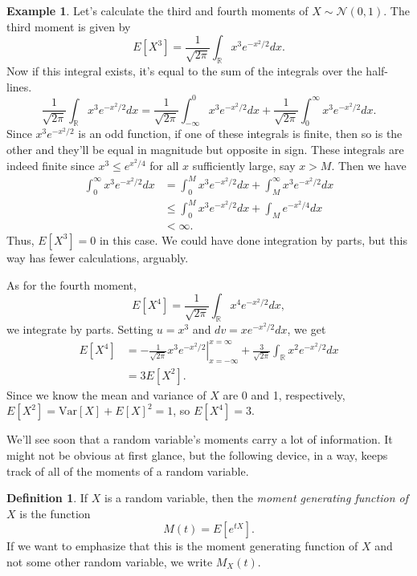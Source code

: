 \documentclass[12pt]{article}
\theoremstyle{plain}
\theoremstyle{definition}
\newtheorem{definition}[theorem]{Definition}
\newtheorem{example}[theorem]{Example}
\theoremstyle{remark}
\newcommand{\Var}{\ensuremath{\textrm{Var}}}
\newcommand{\R}{\mathbb{R}}
\begin{document}
\begin{example}
    Let's calculate the third and fourth moments of $X\sim \mathcal{N}(0, 1)$.
    The third moment is given by
    \[
        E[X^3] = \frac{1}{\sqrt{2\pi}}\int_\R x^3 e^{-x^2/2}dx.
    \]
    Now if this integral exists, it's equal to the sum of the integrals over the half-lines.
    \[
        \frac{1}{\sqrt{2\pi}}\int_\R x^3e^{-x^2/2}dx = \frac{1}{\sqrt{2\pi}}\int_{-\infty}^0 x^3e^{-x^2/2}dx + \frac{1}{\sqrt{2\pi}}\int_0^\infty x^3e^{-x^2/2}dx.
    \]
    Since $x^3e^{-x^2/2}$ is an odd function, if one of these integrals is finite, then so is the other and they'll be equal in magnitude but opposite in sign.
    These integrals are indeed finite since $x^3 \leq e^{x^2/4}$ for all $x$ sufficiently large, say $x>M$.
    Then we have
    \begin{align*}
        \int_0^\infty x^3e^{-x^2/2}dx &= \int_0^M x^3e^{-x^2/2}dx + \int_M^\infty x^3e^{-x^2/2}dx\\
        &\leq \int_0^Mx^3e^{-x^2/2}dx + \int_Me^{-x^2/4}dx\\
        &<\infty.
    \end{align*}
    Thus, $E[X^3] = 0$ in this case.
    We could have done integration by parts, but this way has fewer calculations, arguably.

    As for the fourth moment,
    \[
        E[X^4] = \frac{1}{\sqrt{2\pi}}\int_\R x^4e^{-x^2/2}dx,
    \]
    we integrate by parts.
    Setting $u = x^3$ and $dv = xe^{-x^2/2}dx$, we get
    \begin{align*}
        E[X^4] &= \left.-\frac{1}{\sqrt{2\pi}}x^3e^{-x^2/2}\right|_{x=-\infty}^{x = \infty} + \frac{3}{\sqrt{2\pi}}\int_\R x^2e^{-x^2/2}dx\\
        &= 3E[X^2].
    \end{align*}
    Since we know the mean and variance of $X$ are 0 and 1, respectively, $E[X^2] = \Var[X] + E[X]^2 = 1$, so $E[X^4] = 3$.
\end{example}

We'll see soon that a random variable's moments carry a lot of information.
It might not be obvious at first glance, but the following device, in a way, keeps track of all of the moments of a random variable.
\begin{definition}
    If $X$ is a random variable, then the \emph{moment generating function of $X$} is the function
    \[
        M(t) = E[e^{tX}].
    \]
    If we want to emphasize that this is the moment generating function of $X$ and not some other random variable, we write $M_X(t)$.
\end{definition}
\end{document}
